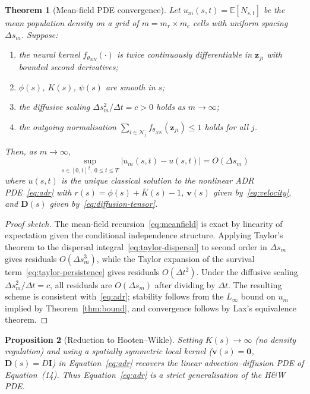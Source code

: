 \documentclass[12pt,a4paper]{article}
\newtheorem{theorem}{Theorem}
\newtheorem{proposition}[theorem]{Proposition}
\theoremstyle{definition}
\newcommand{\E}{\mathbb{E}}
\newcommand{\bz}{\bm{z}}
\newcommand{\nn}{f_{\theta_{NN}}}
\begin{document}
\begin{theorem}[Mean-field PDE convergence]
\label{thm:pde}
Let $u_m(s,t) = \E[N_{s,t}]$ be the mean population density on a grid of
$m = m_r \times m_c$ cells with uniform spacing $\Delta s_m$.
Suppose:
\begin{enumerate}[label=(\roman*),noitemsep]
  \item the neural kernel $\nn(\cdot)$ is twice continuously differentiable
        in $\bz_{ji}$ with bounded second derivatives;
  \item $\phi(s)$, $K(s)$, $\psi(s)$ are smooth in $s$;
  \item the diffusive scaling $\Delta s_m^2 / \Delta t = c > 0$ holds as
        $m \to \infty$;
  \item the outgoing normalisation $\sum_{i\in\mathcal{N}_j} f_{\theta_{NN}}(\bz_{ji}) \leq 1$
        holds for all $j$.
\end{enumerate}
Then, as $m \to \infty$,
\[
  \sup_{s \in [0,1]^2,\; 0 \leq t \leq T}
  \bigl|u_m(s,t) - u(s,t)\bigr| = O(\Delta s_m)
\]
where $u(s,t)$ is the unique classical solution to the nonlinear
\textup{ADR} \textup{PDE}~\eqref{eq:adr} with $r(s)=\phi(s)+\bar{K}(s)-1$,
$\mathbf{v}(s)$ given by~\eqref{eq:velocity}, and $\mathbf{D}(s)$ given
by~\eqref{eq:diffusion-tensor}.
\end{theorem}

\begin{proof}[Proof sketch]
The mean-field recursion~\eqref{eq:meanfield} is exact by linearity of
expectation given the conditional independence structure.  Applying
Taylor's theorem to the dispersal integral~\eqref{eq:taylor-dispersal} to
second order in $\Delta s_m$ gives residuals $O(\Delta s_m^3)$, while the
Taylor expansion of the survival term~\eqref{eq:taylor-persistence} gives
residuals $O(\Delta t^2)$.  Under the diffusive scaling
$\Delta s_m^2 / \Delta t = c$, all residuals are $O(\Delta s_m)$ after
dividing by $\Delta t$.  The resulting scheme is consistent with~\eqref{eq:adr};
stability follows from the $L_\infty$ bound on $u_m$ implied by
Theorem~\ref{thm:bound}, and convergence follows by Lax's equivalence theorem.
\end{proof}

\begin{proposition}[Reduction to Hooten--Wikle]
\label{prop:hw-reduction}
Setting $K(s)\to\infty$ (no density regulation) and using a spatially
symmetric local kernel ($\mathbf{v}(s)=\mathbf{0}$, $\mathbf{D}(s)=D\mathbf{I}$)
in Equation~\eqref{eq:adr} recovers the linear advection--diffusion PDE of
\citet{hooten2010} Equation~(14).  Thus Equation~\eqref{eq:adr} is a strict
generalisation of the H\&W PDE.
\end{proposition}
\end{document}
